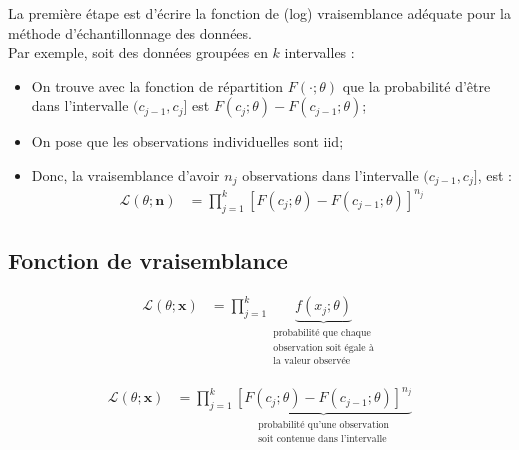 \documentclass[10pt, french]{article}
\begin{document}
\begin{multicols*}{2}
La première étape est d'écrire la fonction de (log) vraisemblance adéquate pour la méthode d'échantillonnage des données.\\

Par exemple, soit des données groupées en $k$ intervalles : 
\begin{itemize}
	\item	On trouve avec la fonction de répartition $F(\cdot; \theta)$ que la probabilité d'être dans l'intervalle $(c_{j - 1}, c_{j}]$ est $F(c_{j}; \theta)	-	F(c_{j - 1}; \theta)$;
	\item	On pose que les observations individuelles sont iid;
	\item	Donc, la vraisemblance d'avoir $n_{j}$ observations dans l'intervalle $(c_{j - 1}, c_{j}]$,  est :
		\begin{align*}
		\mathcal{L}(\theta; \bm{n})
		&=	\prod^{k}_{j	=	1} \left[F(c_{j}; \theta)	-	F(c_{j - 1}; \theta)\right]^{n_{j}}
		\end{align*}
\end{itemize}


\setlength{\mathindent}{-0.75cm}
\subsection{Fonction de vraisemblance}
\begin{definitionNOHFILLprop}
\begin{align*}
	\mathcal{L}(\theta; \bm{x})
	&=	\prod^{k}_{j	=	1} \underbrace{f(x_{j}; \theta)}_{\substack{\text{probabilité que chaque}\\ \text{observation soit égale à}\\ \text{la valeur observée}}}
\end{align*}
\end{definitionNOHFILLprop}

\begin{definitionNOHFILLprop}
\begin{align*}
	\mathcal{L}(\theta; \bm{x})
	&=	\prod^{k}_{j	=	1} \underbrace{\left[F(c_{j}; \theta)	-	F(c_{j - 1}; \theta)\right]^{n_{j}}}_{\substack{\text{probabilité qu'une observation}\\ \text{soit contenue dans l'intervalle}}}
\end{align*}
\end{definitionNOHFILLprop}


\end{multicols*}
\end{document}
